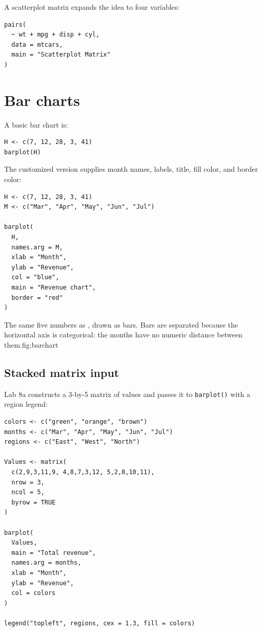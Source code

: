 A scatterplot matrix expands the idea to four variables:

\begin{lstlisting}[style=dsr]
pairs(
  ~ wt + mpg + disp + cyl,
  data = mtcars,
  main = "Scatterplot Matrix"
)
\end{lstlisting}

\section{Bar charts}

A basic bar chart is:

\begin{lstlisting}[style=dsr]
H <- c(7, 12, 28, 3, 41)
barplot(H)
\end{lstlisting}

The customized version supplies month names, labels, title, fill color, and border color:

\begin{lstlisting}[style=dsr]
H <- c(7, 12, 28, 3, 41)
M <- c("Mar", "Apr", "May", "Jun", "Jul")

barplot(
  H,
  names.arg = M,
  xlab = "Month",
  ylab = "Revenue",
  col = "blue",
  main = "Revenue chart",
  border = "red"
)
\end{lstlisting}

\begin{utpfig}{The same five numbers as , drawn
as bars. Bars are separated because the horizontal axis is categorical: the
months have no numeric distance between them.}{fig:barchart}

\end{utpfig}

\subsection{Stacked matrix input}

Lab 8a constructs a 3-by-5 matrix of values and passes it to \texttt{barplot()} with a region legend:

\begin{lstlisting}[style=dsr]
colors <- c("green", "orange", "brown")
months <- c("Mar", "Apr", "May", "Jun", "Jul")
regions <- c("East", "West", "North")

Values <- matrix(
  c(2,9,3,11,9, 4,8,7,3,12, 5,2,8,10,11),
  nrow = 3,
  ncol = 5,
  byrow = TRUE
)

barplot(
  Values,
  main = "Total revenue",
  names.arg = months,
  xlab = "Month",
  ylab = "Revenue",
  col = colors
)

legend("topleft", regions, cex = 1.3, fill = colors)
\end{lstlisting}

